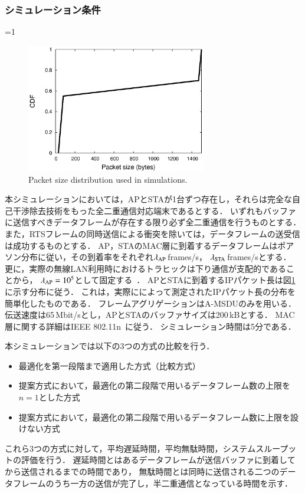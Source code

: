 \documentclass[master]{kuisthesis}		%
\newcounter{flagFig}
\begin{document}
		\subsubsection{シミュレーション条件}
			\ifnum\value{flagFig}=1 {\begin{figure}[htbp]
				\begin{center}
					\includegraphics[width=0.7\textwidth]{graph/traffic.eps}
					\caption{Packet size distribution used in simulations.}
					\label{fig:traffic}
				\end{center}
			\end{figure}}\fi
			本シミュレーションにおいては，APとSTAが1台ずつ存在し，それらは完全な自己干渉除去技術をもった全二重通信対応端末であるとする．
			いずれもバッファに送信すべきデータフレームが存在する限り必ず全二重通信を行うものとする．
			また，RTSフレームの同時送信による衝突を除いては，データフレームの送受信は成功するものとする．
			AP，STAのMAC層に到着するデータフレームはポアソン分布に従い，その到着率をそれぞれ$\lambda_{\rm{AP}}$\,frames/s，
			$\lambda_{\rm{STA}}$\,frames/sとする．
			更に，実際の無線LAN利用時におけるトラヒックは下り通信が支配的であることから，
			$\lambda_{\rm{AP}}=10^{5}$として固定する~\cite{traffic}．
			APとSTAに到着するIPパケット長は図\ref{fig:traffic}に示す分布に従う．
			これは，実際に\cite{traffic}によって測定されたIPパケット長の分布を簡単化したものである．
			フレームアグリゲーションはA-MSDUのみを用いる．
			伝送速度は65\,Mbit/sとし，APとSTAのバッファサイズは200\,kBとする．
			MAC層に関する詳細はIEEE 802.11n~\cite{stdn}に従う．
			シミュレーション時間は5分である．
			\par
			本シミュレーションでは以下の3つの方式の比較を行う．
			\begin{itemize}
				\item 最適化を第一段階まで適用した方式（比較方式）
				\item 提案方式において，最適化の第二段階で用いるデータフレーム数の上限を$n=1$とした方式
				\item 提案方式において，最適化の第二段階で用いるデータフレーム数に上限を設けない方式
			\end{itemize}
			これら3つの方式に対して，平均遅延時間，平均無駄時間，システムスループットの評価を行う．
			遅延時間とはあるデータフレームが送信バッファに到着してから送信されるまでの時間であり，
			無駄時間とは同時に送信される二つのデータフレームのうち一方の送信が完了し，半二重通信となっている時間を示す．
\end{document}
